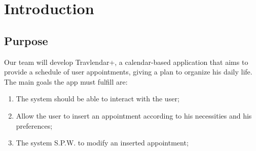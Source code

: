 \chapter{Introduction}

\section{Purpose}

Our team will develop Travlendar+, a calendar-based application that aims to provide a schedule of user appointments, giving a plan to organize his daily life.
The main goals the app must fulfill are:

\begin{enumerate}
\renewcommand\labelenumi{\textbf{G\theenumi}}

\item The system should be able to interact with the user;
\label{goal:G1}

\item Allow the user to insert an appointment according to his necessities and his preferences;
\label{goal:G2}

\item The system S.P.W. to modify an inserted appointment;
\label{goal:G3} 


\end{enumerate}
